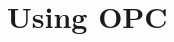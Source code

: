 \documentclass{book}
\begin{document}
%
%
%
%	
%
%
%
%
%
%
%
%
%
%
%



\chapter{Using OPC}
\end{document}
